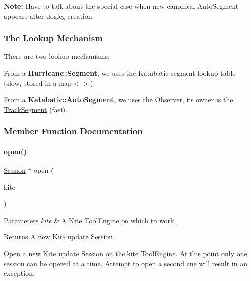 {\bfseries Note\+:} Have to talk about the special case when new canonical Auto\+Segment appears after dogleg creation.\hypertarget{classKite_1_1Session_secKiteSessionLookup}{}\subsubsection{The Lookup Mechanism}\label{classKite_1_1Session_secKiteSessionLookup}
There are two lookup mechanisms\+:
\begin{DoxyItemize}
\item From a \textbf{ Hurricane\+::\+Segment}, we uses the Katabatic segment lookup table (slow, stored in a {\ttfamily map$<$$>$}).
\item From a \textbf{ Katabatic\+::\+Auto\+Segment}, we uses the Observer, it\textquotesingle{}s owner is the \mbox{\hyperlink{classKite_1_1TrackSegment}{Track\+Segment}} (fast). 
\end{DoxyItemize}

\subsubsection{Member Function Documentation}
\mbox{\label{classKite_1_1Session_ab8362982a442b5a67f5bd76d6b6caf93}} 
\paragraph{\texorpdfstring{open()}{open()}}
{\footnotesize\ttfamily \mbox{\hyperlink{classKite_1_1Session}{Session}} $\ast$ open (\begin{DoxyParamCaption}\item[{\mbox{\hyperlink{classKite_1_1KiteEngine}{Kite\+Engine}} $\ast$}]{kite }\end{DoxyParamCaption})\hspace{0.3cm}{\ttfamily [static]}}


\begin{DoxyParams}{Parameters}
{\em kite} & A \mbox{\hyperlink{namespaceKite}{Kite}} Tool\+Engine on which to work. \\
\hline
\end{DoxyParams}
\begin{DoxyReturn}{Returns}
A new \mbox{\hyperlink{namespaceKite}{Kite}} update \mbox{\hyperlink{classKite_1_1Session}{Session}}.
\end{DoxyReturn}
Open a new \mbox{\hyperlink{namespaceKite}{Kite}} update \mbox{\hyperlink{classKite_1_1Session}{Session}} on the {\ttfamily kite} {\ttfamily Tool\+Engine}. At this point only one session can be opened at a time. Attempt to open a second one will result in an exception. \mbox{\label{classKite_1_1Session_a76f17c3642eaeba85fa0af5ae9d208b4}} 
